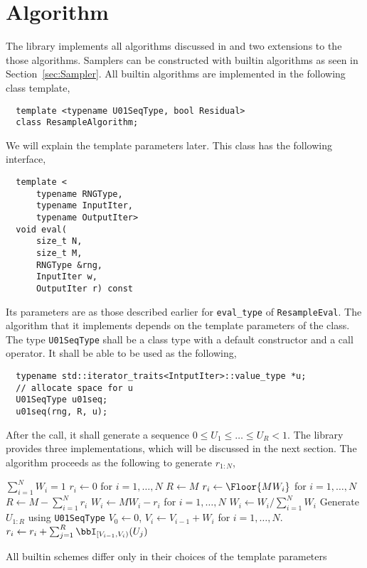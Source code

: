 \section{Algorithm}
\label{sec:Algorithm}

The library implements all algorithms discussed in \cite{Douc:2005wa} and two
extensions to the those algorithms. Samplers can be constructed with builtin
algorithms as seen in Section~\ref{sec:Sampler}. All builtin algorithms are
implemented in the following class template,
\begin{Verbatim}
  template <typename U01SeqType, bool Residual>
  class ResampleAlgorithm;
\end{Verbatim}
We will explain the template parameters later. This class has the following
interface,
\begin{Verbatim}
  template <
      typename RNGType,
      typename InputIter,
      typename OutputIter>
  void eval(
      size_t N,
      size_t M,
      RNGType &rng,
      InputIter w,
      OutputIter r) const
\end{Verbatim}
Its parameters are as those described earlier for \verb|eval_type| of
\verb|ResampleEval|. The algorithm that it implements depends on the template
parameters of the class. The type \verb|U01SeqType| shall be a class type with
a default constructor and a call operator. It shall be able to be used as the
following,
\begin{Verbatim}
  typename std::iterator_traits<IntputIter>::value_type *u;
  // allocate space for u
  U01SeqType u01seq;
  u01seq(rng, R, u);
\end{Verbatim}
After the call, it shall generate a sequence $0 \le U_1 \le \dots\le U_R < 1$.
The library provides three implementations, which will be discussed in the next
section. The algorithm proceeds as the following to generate $r_{1:N}$,
\begin{algorithmic}
  \REQUIRE $\sum_{i=1}^N W_i = 1$
  \STATE $r_i \leftarrow 0$ for $i = 1,\dots,N$
  \STATE $R \leftarrow M$
  \ELSE
  \STATE $r_i \leftarrow \Floor{MW_i}$ for $i = 1,\dots,N$
  \STATE $R \leftarrow M - \sum_{i=1}^N r_i$
  \STATE $W_i \leftarrow MW_i - r_i$ for $i = 1,\dots,N$
  \STATE $W_i \leftarrow W_i / \sum_{i=1}^NW_i$
  \ENDIF
  \STATE Generate $U_{1:R}$ using \verb|U01SeqType|
  \STATE $V_0 \leftarrow 0$, $V_i \leftarrow V_{i - 1} + W_i$ for $i =
  1,\dots,N$.
  \STATE $r_i \leftarrow r_i + \sum_{j=1}^R\bbI_{[V_{i-1},V_i)}(U_j)$
\end{algorithmic}
All builtin schemes differ only in their choices of the template parameters

